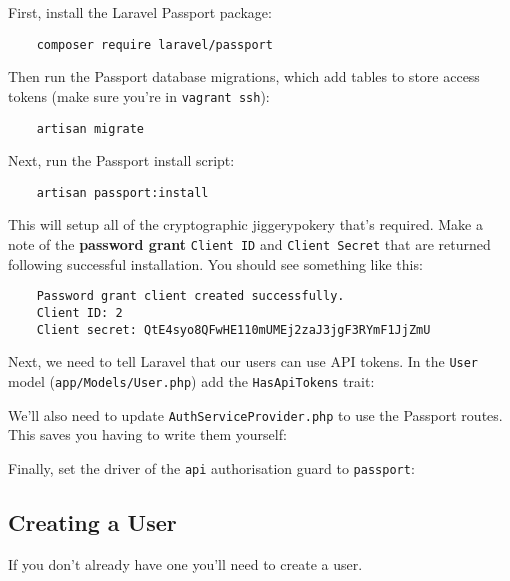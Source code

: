 First, install the Laravel Passport package:

\begin{verbatim}
    composer require laravel/passport
\end{verbatim}

Then run the Passport database migrations, which add tables to store access tokens (make sure you're in \texttt{vagrant ssh}):

\begin{verbatim}
    artisan migrate
\end{verbatim}

Next, run the Passport install script:

\begin{verbatim}
    artisan passport:install
\end{verbatim}

This will setup all of the cryptographic jiggerypokery that's required. Make a note of the \textbf{password grant} \texttt{Client ID} and \texttt{Client Secret} that are returned following successful installation. You should see something like this:

\begin{verbatim}
    Password grant client created successfully.
    Client ID: 2
    Client secret: QtE4syo8QFwHE110mUMEj2zaJ3jgF3RYmF1JjZmU
\end{verbatim}

Next, we need to tell Laravel that our users can use API tokens. In the \texttt{User} model (\texttt{app/Models/User.php}) add the \texttt{HasApiTokens} trait:



We'll also need to update \texttt{AuthServiceProvider.php} to use the Passport routes. This saves you having to write them yourself:



Finally, set the driver of the \texttt{api} authorisation guard to \texttt{passport}:



\subsection{Creating a User}

If you don't already have one you'll need to create a user.
\\

